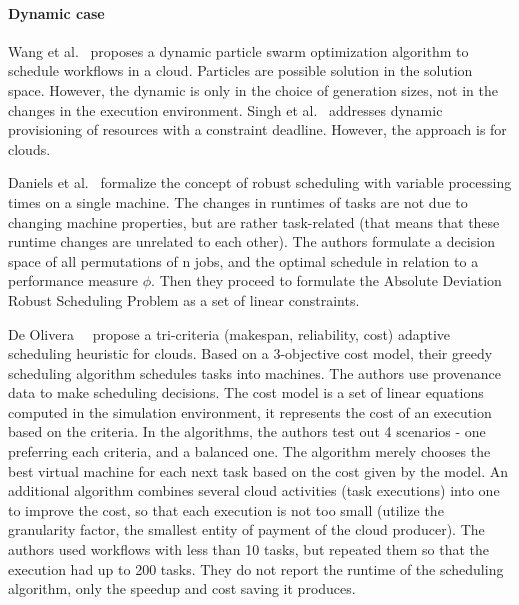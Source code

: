 \documentclass[conference]{IEEEtran}
\begin{document}

    \paragraph{Dynamic case}
    Wang et al.~\cite{wang2019dynamic} proposes a dynamic particle swarm optimization algorithm to schedule workflows in a cloud.
    Particles are possible solution in the solution space.
    However, the dynamic is only in the choice of generation sizes, not in the changes in the execution environment.
    Singh et al.~\cite{singh2018novel} addresses dynamic provisioning of resources with a constraint deadline.
    However, the approach is for clouds.
    \xspace

    Daniels et al.~\cite{daniels1995robust} formalize the concept of robust scheduling with variable processing times
    on a single machine.
    The changes in runtimes of tasks are not due to changing machine properties, but are rather task-related (that means
    that these runtime changes are unrelated to each other).
    The authors formulate a decision space of all permutations of n jobs, and the optimal schedule in relation to a
    performance measure $\phi$.
    Then they proceed to formulate the Absolute Deviation Robust Scheduling Problem as a set of linear constraints.

    De Olivera~\etal~\cite{de2012provenance} propose a tri-criteria (makespan, reliability, cost) adaptive scheduling heuristic
    for clouds.
    Based on a 3-objective cost model, their greedy scheduling algorithm schedules tasks into machines.
    The authors use provenance data to make scheduling decisions.
    The cost model is a set of linear equations computed in the simulation environment, it represents the cost of an execution based on the criteria.
    In the algorithms, the authors test out 4 scenarios - one preferring each criteria, and a balanced one.
    The algorithm merely chooses the best virtual machine for each next task based on the cost given by the model.
    An additional algorithm combines several cloud activities (task executions) into one to improve the cost, so that each
    execution is not too small (utilize the granularity factor, the smallest entity of payment of the cloud producer).
    The authors used workflows with less than 10 tasks, but repeated them so that the execution had up to 200 tasks.
    They do not report the runtime of the scheduling algorithm, only the speedup and cost saving it produces.
\end{document}
